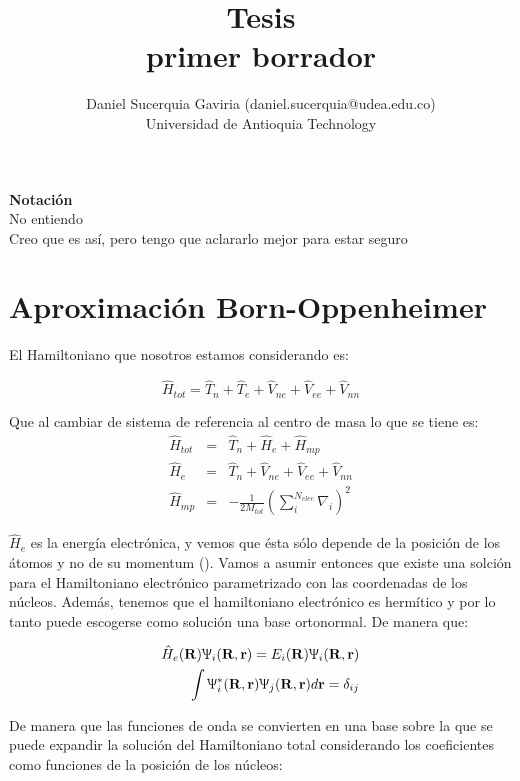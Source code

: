 \documentclass [11pt]{article}
\title{Tesis \\\medskip primer borrador}
\author{Daniel Sucerquia Gaviria (daniel.sucerquia@udea.edu.co)\\Universidad de Antioquia Technology}
\begin{document}
\maketitle

{\Large \bf Notación}\\

{\color{red} No entiendo}\\
{\color{blue} Creo que es así, pero tengo que aclararlo mejor para estar seguro}\\
\section{Aproximación Born-Oppenheimer}

El Hamiltoniano que nosotros estamos considerando es:

\begin{equation}
    {\hat H}_{tot}={\hat T}_n+{\hat T}_e+{\hat V}_{ne}+{\hat V}_{ee}+{\hat V}_{nn}
\end{equation}

Que al cambiar de sistema de referencia al centro de masa lo que se tiene es:
\begin{eqnarray}
    {\hat H}_{tot} & =  & {\hat T}_n+{\hat H}_e+{\hat H}_{mp} \\
    {\hat H}_e & = & {\hat T}_n+{\hat V}_{ne}+{\hat V}_{ee}+{\hat V}_{nn}\\
    {\hat H}_{mp} & = & -\frac{1}{2M_{tot}}\left(\sum_i^{N_{elec}}\nabla_i\right)^2
\end{eqnarray}

$\hat H_e $ es la energía electrónica, y vemos que ésta sólo depende de la posición de los átomos y no de su momentum ({}). Vamos a asumir entonces que existe una solción para el Hamiltoniano electrónico parametrizado con las coordenadas de los núcleos. Además, tenemos que el hamiltoniano electrónico es hermítico y por lo tanto puede escogerse como solución una base ortonormal. De manera que:

\begin{eqnarray}
    {\hat H}_e({\bf R}) \Uppsi_i({\bf R},{\bf r})=E_i({\bf R}) \Uppsi_i({\bf R},{\bf r})\\
    \int \Uppsi_i^*({\bf R},{\bf r})\Uppsi_j({\bf R},{\bf r})d{\bf r}=\delta_{ij}
\end{eqnarray}

De manera que las funciones de onda se convierten en una base sobre la que se puede expandir la solución del Hamiltoniano total considerando los coeficientes como funciones de la posición de los núcleos:
\end{document}
